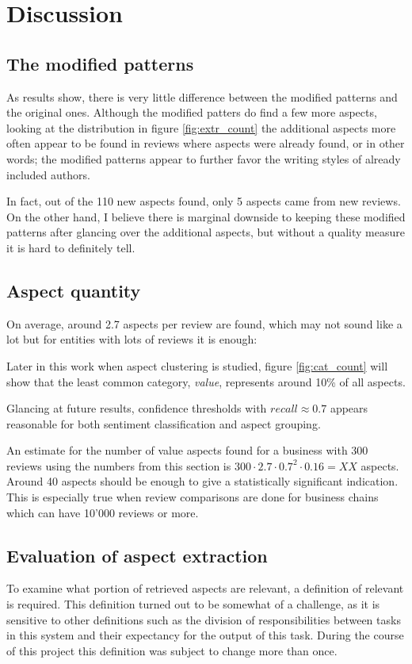 \documentclass[a4paper,11pt]{kth-mag}
\newcommand{\numValueAspects}{XX}
\begin{document}
\section{Discussion}
\subsection{The modified patterns}
As results show, there is very little difference between the modified patterns and
the original ones. Although the modified patters do find a few more aspects, looking
at the distribution in figure \ref{fig:extr_count} the additional aspects more often
appear to be found in reviews where aspects were already found, or in other words;
the modified patterns appear to further favor the writing styles of already included authors.

In fact, out of the 110 new aspects found, only 5 aspects came from new reviews.
On the other hand, I believe there is marginal downside to keeping these modified
patterns after glancing over the additional aspects, but without a quality measure
it is hard to definitely tell. 

\subsection{Aspect quantity}


On average, around 2.7 aspects per review are found, which may not sound like a lot 
but for entities with lots of reviews it is enough:

Later in this work when aspect clustering is studied, figure \ref{fig:cat_count}
will show that the least common category, \emph{value}, represents around
10\% of all aspects.

Glancing at future results, confidence thresholds with $recall\approx 0.7$
appears reasonable for both sentiment classification and aspect grouping.

An estimate for the number of value aspects found for a business with 300 reviews
using the numbers from this section is $300 \cdot 2.7 \cdot 0.7^2 \cdot 0.16 =
\numValueAspects $ aspects. %
Around 40 aspects should be enough to give a statistically significant indication.
This is especially true when review comparisons are done for
business chains which can have 10'000 reviews or more.

\subsection{Evaluation of aspect extraction}
\label{subsec:aspect_eval}
To examine what portion of retrieved aspects are relevant, a definition of relevant
is required. This definition turned out to be somewhat of a challenge, as it is sensitive
to other definitions such as the division of responsibilities between tasks
in this system and their expectancy for the output of this task.
During the course of this project this definition was subject to change more than once.
\end{document}
